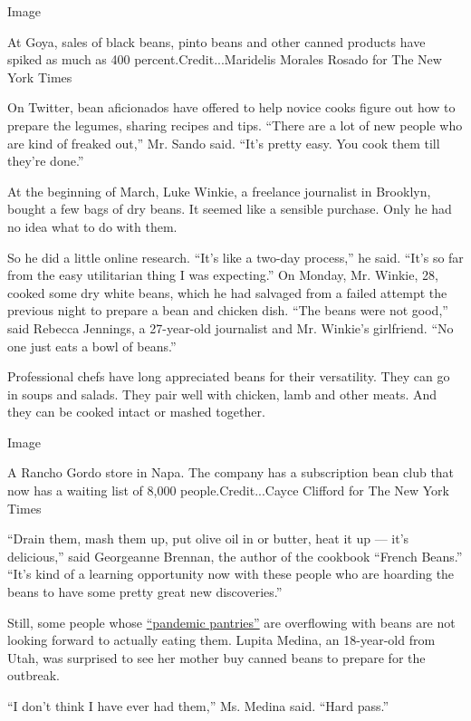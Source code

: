 Image

At Goya, sales of black beans, pinto beans and other canned products
have spiked as much as 400 percent.Credit...Maridelis Morales Rosado for
The New York Times

On Twitter, bean aficionados have offered to help novice cooks figure
out how to prepare the legumes, sharing recipes and tips. ``There are a
lot of new people who are kind of freaked out,'' Mr. Sando said. ``It's
pretty easy. You cook them till they're done.''

At the beginning of March, Luke Winkie, a freelance journalist in
Brooklyn, bought a few bags of dry beans. It seemed like a sensible
purchase. Only he had no idea what to do with them.

So he did a little online research. ``It's like a two-day process,'' he
said. ``It's so far from the easy utilitarian thing I was expecting.''
On Monday, Mr. Winkie, 28, cooked some dry white beans, which he had
salvaged from a failed attempt the previous night to prepare a bean and
chicken dish. ``The beans were not good,'' said Rebecca Jennings, a
27-year-old journalist and Mr. Winkie's girlfriend. ``No one just eats a
bowl of beans.''

Professional chefs have long appreciated beans for their versatility.
They can go in soups and salads. They pair well with chicken, lamb and
other meats. And they can be cooked intact or mashed together.

Image

A Rancho Gordo store in Napa. The company has a subscription bean club
that now has a waiting list of 8,000 people.Credit...Cayce Clifford for
The New York Times

``Drain them, mash them up, put olive oil in or butter, heat it up ---
it's delicious,'' said Georgeanne Brennan, the author of the cookbook
``French Beans.'' ``It's kind of a learning opportunity now with these
people who are hoarding the beans to have some pretty great new
discoveries.''

Still, some people whose
\href{https://www.nielsen.com/us/en/insights/article/2020/nielsen-investigation-pandemic-pantries-pressure-supply-chain-amidst-covid-19-fears/}{``pandemic
pantries''} are overflowing with beans are not looking forward to
actually eating them. Lupita Medina, an 18-year-old from Utah, was
surprised to see her mother buy canned beans to prepare for the
outbreak.

``I don't think I have ever had them,'' Ms. Medina said. ``Hard pass.''

